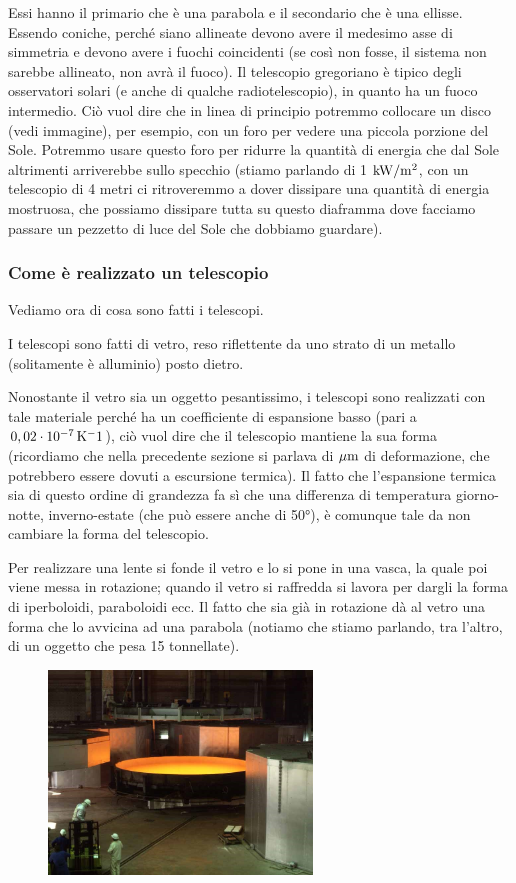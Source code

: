 Essi hanno il primario che è una parabola e il secondario che è una ellisse. Essendo coniche, perché siano allineate devono avere il medesimo asse di simmetria e devono avere i fuochi coincidenti (se così non fosse, il sistema non sarebbe allineato, non avrà il fuoco). Il telescopio gregoriano è tipico degli osservatori solari (e anche di qualche radiotelescopio), in quanto ha un fuoco intermedio. Ciò vuol dire che in linea di principio potremmo collocare un disco (vedi immagine), per esempio, con un foro per vedere una piccola porzione del Sole. Potremmo usare questo foro per ridurre la quantità di energia che dal Sole altrimenti arriverebbe sullo specchio (stiamo parlando di 1 $\rm kW/m^2$, con un telescopio di 4 metri ci ritroveremmo a dover dissipare una quantità di energia mostruosa, che possiamo dissipare tutta su questo diaframma dove facciamo passare un pezzetto di luce del Sole che dobbiamo guardare).

\subsubsection{Come è realizzato un telescopio}
Vediamo ora di cosa sono fatti i telescopi.

I telescopi sono fatti di vetro, reso riflettente da uno strato di un metallo (solitamente è alluminio) posto dietro.

Nonostante il vetro sia un oggetto pesantissimo, i telescopi sono realizzati con tale materiale perché ha un coefficiente di espansione basso (pari a $\rm 0,02 \cdot 10^{-7} \, K^-1$), ciò vuol dire che il telescopio mantiene la sua forma (ricordiamo che nella precedente sezione si parlava di $\rm \mu m$ di deformazione, che potrebbero essere dovuti a escursione termica). Il fatto che l'espansione termica sia di questo ordine di grandezza fa sì che una differenza di temperatura giorno-notte, inverno-estate (che può essere anche di 50°), è comunque tale da non cambiare la forma del telescopio. 

Per realizzare una lente si fonde il vetro e lo si pone in una vasca, la quale poi viene messa in rotazione; quando il vetro si raffredda si lavora per dargli la forma di iperboloidi, paraboloidi ecc. Il fatto che sia già in rotazione dà al vetro una forma che lo avvicina ad una parabola (notiamo che stiamo parlando, tra l'altro, di un oggetto che pesa 15 tonnellate).

\begin{figure}[H]
        \centering
        \includegraphics[width=7cm]{6.jpg}
        \label{}
\end{figure}

